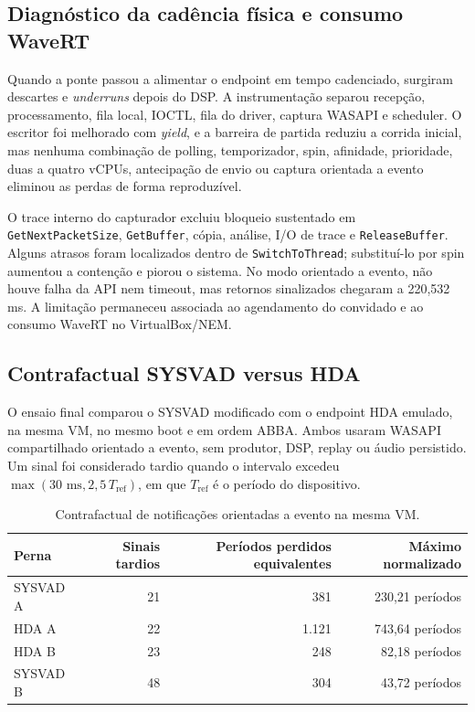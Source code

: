 \subsection{Diagnóstico da cadência física e consumo WaveRT}

Quando a ponte passou a alimentar o endpoint em tempo cadenciado, surgiram descartes e \textit{underruns} depois do DSP. A instrumentação separou recepção, processamento, fila local, IOCTL, fila do driver, captura WASAPI e scheduler. O escritor foi melhorado com \textit{yield}, e a barreira de partida reduziu a corrida inicial, mas nenhuma combinação de polling, temporizador, spin, afinidade, prioridade, duas a quatro vCPUs, antecipação de envio ou captura orientada a evento eliminou as perdas de forma reproduzível.

O trace interno do capturador excluiu bloqueio sustentado em \texttt{GetNextPacketSize}, \texttt{GetBuffer}, cópia, análise, I/O de trace e \texttt{ReleaseBuffer}. Alguns atrasos foram localizados dentro de \texttt{SwitchToThread}; substituí-lo por spin aumentou a contenção e piorou o sistema. No modo orientado a evento, não houve falha da API nem timeout, mas retornos sinalizados chegaram a 220,532 ms. A limitação permaneceu associada ao agendamento do convidado e ao consumo WaveRT no VirtualBox/NEM.

\subsection{Contrafactual SYSVAD versus HDA}

O ensaio final comparou o SYSVAD modificado com o endpoint HDA emulado, na mesma VM, no mesmo boot e em ordem ABBA. Ambos usaram WASAPI compartilhado orientado a evento, sem produtor, DSP, replay ou áudio persistido. Um sinal foi considerado tardio quando o intervalo excedeu \(\max(30\text{ ms}, 2{,}5\,T_{\mathrm{ref}})\), em que \(T_{\mathrm{ref}}\) é o período do dispositivo.

\begin{table}[!htbp]
\centering
\caption{Contrafactual de notificações orientadas a evento na mesma VM.}
\label{tab:contrafactual}
\small
\begin{tabularx}{\textwidth}{Xrrr}
\toprule
\textbf{Perna} & \textbf{Sinais tardios} & \textbf{Períodos perdidos equivalentes} & \textbf{Máximo normalizado} \\
\midrule
SYSVAD A & 21 & 381 & 230,21 períodos \\
HDA A & 22 & 1.121 & 743,64 períodos \\
HDA B & 23 & 248 & 82,18 períodos \\
SYSVAD B & 48 & 304 & 43,72 períodos \\
\bottomrule
\end{tabularx}
\end{table}
\FloatBarrier

